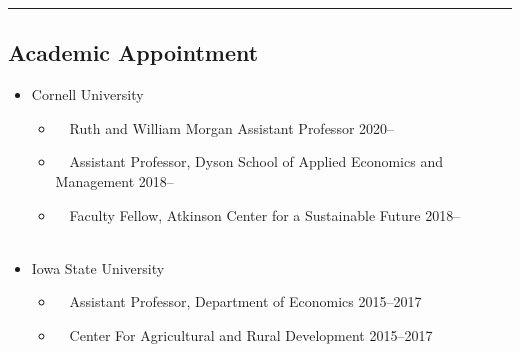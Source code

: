 \documentclass[11pt]{res} %
\begin{document}
\begin{resume}
\vspace{-0.08in}
\hrule
\vspace{-0.1in}

\subsection{Academic Appointment}


	\begin{itemize} \itemsep -12pt
	\item[] Cornell University
		\vspace{-0.05in}
		\begin{itemize} \itemsep -1pt
			\item[] \,\,\,\, Ruth and William Morgan Assistant Professor \hfill 2020--
			\item[] \,\,\,\, Assistant Professor, Dyson School of Applied Economics and Management \hfill 2018--
			\item[] \,\,\,\, Faculty Fellow, Atkinson Center for a Sustainable Future \hfill 2018--\\\
		\end{itemize}
		\vspace{0.075in}
		\item[] Iowa State University
		\vspace{-0.05in}
		\begin{itemize} \itemsep -1pt
			\item[] \,\,\,\, Assistant Professor, Department of Economics \hfill 2015--2017
			\item[] \,\,\,\, Center For Agricultural and Rural Development \hfill 2015--2017 \\\
		\end{itemize}
	\end{itemize}
\vspace{-0.5in}


\end{resume}
\end{document}
